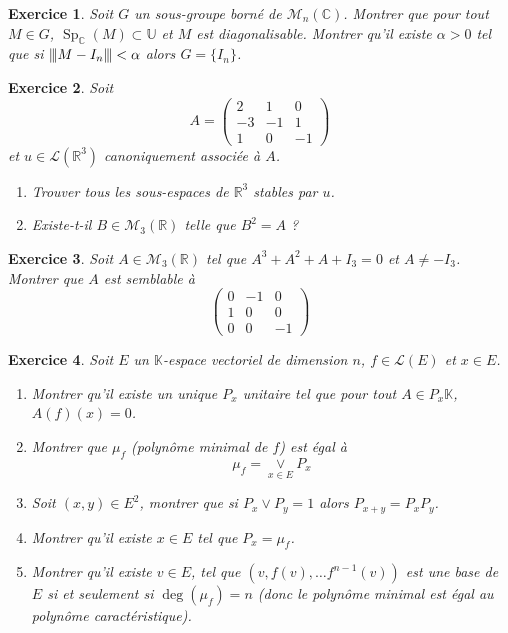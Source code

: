 \documentclass[12pt]{article}
\newtheorem{exercise}{Exercice}[section]
\theoremstyle{remark}
\theoremstyle{remark}
\newcommand{\K}{\mathbb{K}} \newcommand{\R}{\mathbb{R}}
\newcommand{\C}{\mathbb{C}} \newcommand{\Q}{\mathbb{Q}}
\newcommand{\U}{\mathbb{U}} \newcommand{\E}{\mathbb{E}}
\newcommand{\M}{\mathcal{M}} \renewcommand{\L}{\mathcal{L}}
\DeclareMathOperator{\Sp}{Sp} \DeclareMathOperator{\mat}{mat}
\newcommand{\vertiii}[1]{{\left\vert\kern-0.25ex\left\vert\kern-0.25ex\left\vert{}#1
\right\vert\kern-0.25ex\right\vert\kern-0.25ex\right\vert}}
\begin{document}
\begin{exercise}
	Soit $G$ un sous-groupe borné de $\M_{n}(\C)$. Montrer que pour tout $M\in G$, $\Sp_{\C}(M)\subset \U$ et $M$ est diagonalisable. Montrer qu'il existe $\alpha>0$ tel que si $\vertiii{M-I_{n}}<\alpha$ alors $G=\{I_{n}\}$.
\end{exercise}

\begin{exercise}
	Soit 
	$$
	A=
	\begin{pmatrix}
		2 & 1 & 0\\
		-3 & -1 & 1\\
		1 & 0 & -1
	\end{pmatrix}
	$$
	et $u\in\L(\R^{3})$ canoniquement associée à $A$.
	\begin{enumerate}
		\item Trouver tous les sous-espaces de $\R^{3}$ stables par $u$.
		\item Existe-t-il $B\in\M_{3}(\R)$ telle que $B^{2}=A$ ?
	\end{enumerate}
\end{exercise}

\begin{exercise}
	Soit $A\in\M_{3}(\R)$ tel que $A^{3}+A^{2}+A+I_{3}=0$ et $A\neq -I_{3}$. Montrer que $A$ est semblable à
	$$
	\begin{pmatrix}
		0 & -1 & 0\\
		1 & 0 & 0\\
		0 & 0 & -1
	\end{pmatrix}
	$$
\end{exercise}

\begin{exercise}
	Soit $E$ un $\K$-espace vectoriel de dimension $n$, $f\in\L(E)$ et $x\in E$.
	\begin{enumerate}
		\item Montrer qu'il existe un unique $P_{x}$ unitaire tel que pour tout $A\in P_{x}\K$, $A(f)(x)=0$.
		\item Montrer que $\mu_{f}$ (polynôme minimal de $f$) est égal à 
		$$\mu_{f}=\underset{x\in E}{\vee}P_{x}$$
		\item Soit $(x,y)\in E^{2}$, montrer que si $P_{x}\vee P_{y}=1$ alors $P_{x+y}=P_{x}P_{y}$.
		\item Montrer qu'il existe $x\in E$ tel que $P_{x}=\mu_{f}$.
		\item Montrer qu'il existe $v\in E$, tel que $(v,f(v),\dots f^{n-1}(v))$ est une base de $E$ si et seulement si $\deg(\mu_{f})=n$ (donc le polynôme minimal est égal au polynôme caractéristique).
	\end{enumerate}
\end{exercise}
\end{document}
